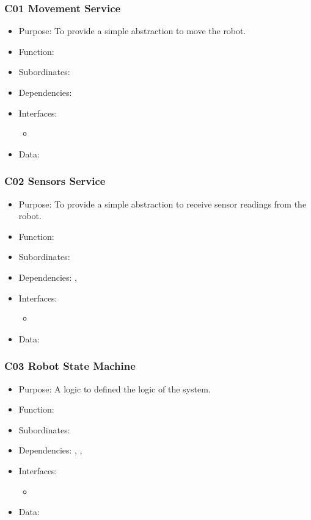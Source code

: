 \subsubsection{C01 Movement Service} \label{compMove}
\begin{itemize}
	\item Purpose: To provide a simple abstraction to move the robot.
	\item Function: 
	\item Subordinates: 
	\item Dependencies: 
	\item Interfaces:
	\begin{itemize}
		\item
	\end{itemize}
	\item Data:
\end{itemize}

\subsubsection{C02 Sensors Service} \label{compSense}
\begin{itemize}
	\item Purpose: To provide a simple abstraction to receive sensor readings from the robot.
	\item Function: 
	\item Subordinates: 
	\item Dependencies: , 
	\item Interfaces:
	\begin{itemize}
		\item
	\end{itemize}
	\item Data:
\end{itemize}

\subsubsection{C03 Robot State Machine} \label{compState}
\begin{itemize}
	\item Purpose: A logic to defined the logic of the system.
	\item Function:
	\item Subordinates: 
	\item Dependencies: , , 
	\item Interfaces:
	\begin{itemize}
		\item
	\end{itemize}
	\item Data:
\end{itemize}

